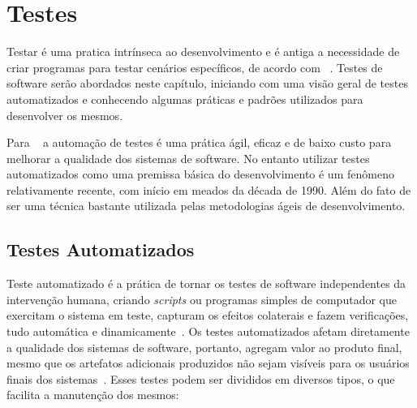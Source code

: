 
\chapter{Testes}
\label{cap:testes}

Testar é uma pratica intrínseca ao desenvolvimento e é antiga a necessidade de
criar programas para testar cenários específicos, de acordo com ~.
%
Testes de software serão abordados neste capítulo, iniciando com uma visão geral de testes 
automatizados e conhecendo algumas práticas e padrões utilizados para desenvolver
os mesmos.

Para ~ a automação de testes é uma prática ágil, eficaz e de baixo custo para melhorar
a qualidade dos sistemas de software. No entanto utilizar testes automatizados 
como uma premissa básica do desenvolvimento é um fenômeno relativamente recente, 
com início em meados  da década de 1990. Além do fato de ser uma técnica bastante utilizada pelas metodologias ágeis
de desenvolvimento.


\section{Testes Automatizados}

Teste automatizado é a prática de tornar os testes de software independentes da
intervenção humana, criando \textit{scripts} ou programas simples de computador que exercitam 
o sistema em teste, capturam os efeitos colaterais e fazem verificações, tudo 
automática e dinamicamente~\cite{meszaros2007}.
%
Os testes automatizados afetam diretamente a qualidade dos sistemas de software,
portanto, agregam valor  ao produto final, mesmo que os artefatos adicionais
produzidos não sejam visíveis para os usuários finais dos sistemas~\cite{bernardo2011}.
Esses testes podem ser divididos em diversos tipos, o que facilita a manutenção 
dos mesmos:


